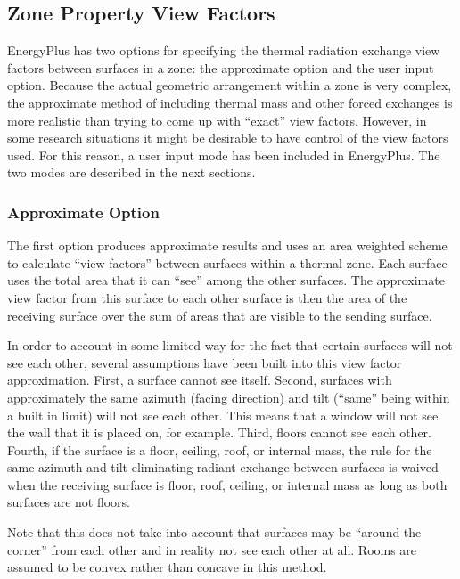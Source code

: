 \subsection{Zone Property View Factors}\label{zone-property-view-factors}

EnergyPlus has two options for specifying the thermal radiation exchange view factors between surfaces in a zone: the approximate option and the user input option. Because the actual geometric arrangement within a zone is very complex, the approximate method of including thermal mass and other forced exchanges is more realistic than trying to come up with ``exact'' view factors. However, in some research situations it might be desirable to have control of the view factors used. For this reason, a user input mode has been included in EnergyPlus. The two modes are described in the next sections.

\subsubsection{Approximate Option}\label{approximate-option}

The first option produces approximate results and uses an area weighted scheme to calculate ``view factors'' between surfaces within a thermal zone. Each surface uses the total area that it can ``see'' among the other surfaces. The approximate view factor from this surface to each other surface is then the area of the receiving surface over the sum of areas that are visible to the sending surface.

In order to account in some limited way for the fact that certain surfaces will not see each other, several assumptions have been built into this view factor approximation. First, a surface cannot see itself. Second, surfaces with approximately the same azimuth (facing direction) and tilt (``same'' being within a built in limit) will not see each other. This means that a window will not see the wall that it is placed on, for example. Third, floors cannot see each other. Fourth, if the surface is a floor, ceiling, roof, or internal mass, the rule for the same azimuth and tilt eliminating radiant exchange between surfaces is waived when the receiving surface is floor, roof, ceiling, or internal mass as long as both surfaces are not floors.

Note that this does not take into account that surfaces may be ``around the corner'' from each other and in reality not see each other at all. Rooms are assumed to be convex rather than concave in this method.

